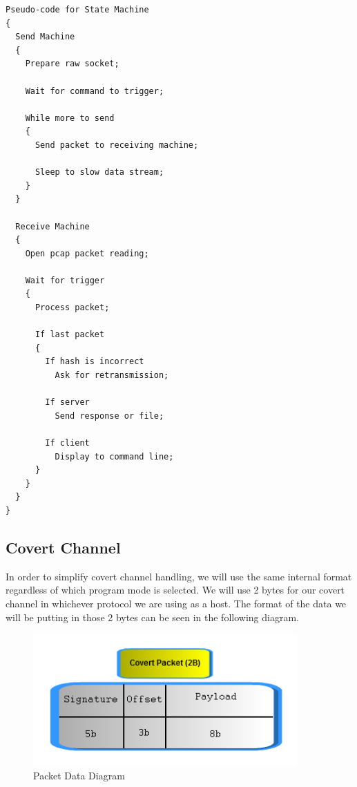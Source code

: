 \documentclass[titlepage]{article}
\begin{document}
\clearpage

\begin{lstlisting}
Pseudo-code for State Machine
{
  Send Machine
  {
    Prepare raw socket;
    
    Wait for command to trigger;
    
    While more to send
    {
      Send packet to receiving machine;
       
      Sleep to slow data stream;
    }
  }
  
  Receive Machine
  {
    Open pcap packet reading;
    
    Wait for trigger
    {
      Process packet;
      
      If last packet
      {
        If hash is incorrect
          Ask for retransmission;
        
        If server
          Send response or file;
      
        If client
          Display to command line;
      }
    }
  }
}
\end{lstlisting}

\clearpage

\subsection{Covert Channel}

In order to simplify covert channel handling, we will use the same internal format regardless of which program mode is selected. We will use 2 bytes for our covert channel
in whichever protocol we are using as a host. The format of the data we will be putting in those 2 bytes can be seen in the following diagram.

\begin{figure}[htb]                                                                       
  \begin{center}
    \includegraphics[width=0.9\textwidth]{imgs/packet.png}
  \end{center}
  \caption{Packet Data Diagram}
  \label{fig:packet}
\end{figure}
\end{document}
